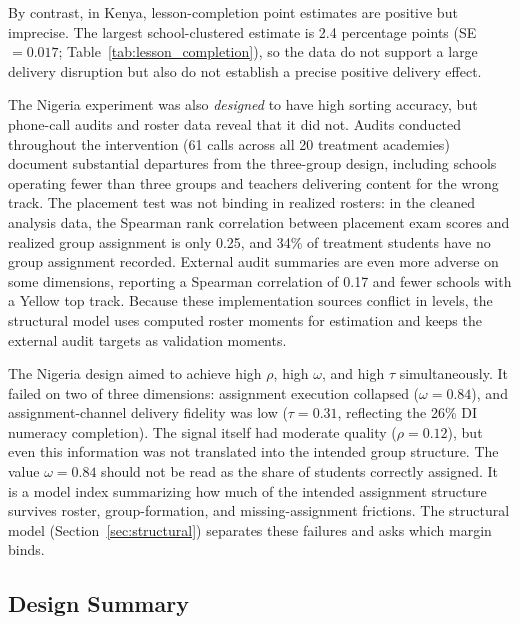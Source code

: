 \documentclass[11pt]{article}
\begin{document}
By contrast, in Kenya, lesson-completion point estimates are positive but imprecise. The largest school-clustered estimate is 2.4 percentage points (SE $=0.017$; Table~\ref{tab:lesson_completion}), so the data do not support a large delivery disruption but also do not establish a precise positive delivery effect.

The Nigeria experiment was also \emph{designed} to have high sorting accuracy, but phone-call audits and roster data reveal that it did not. Audits conducted throughout the intervention (61 calls across all 20 treatment academies) document substantial departures from the three-group design, including schools operating fewer than three groups and teachers delivering content for the wrong track. The placement test was not binding in realized rosters: in the cleaned analysis data, the Spearman rank correlation between placement exam scores and realized group assignment is only 0.25, and 34\% of treatment students have no group assignment recorded. External audit summaries are even more adverse on some dimensions, reporting a Spearman correlation of 0.17 and fewer schools with a Yellow top track. Because these implementation sources conflict in levels, the structural model uses computed roster moments for estimation and keeps the external audit targets as validation moments.

The Nigeria design aimed to achieve high $\rho$, high $\omega$, and high $\tau$ simultaneously. It failed on two of three dimensions: assignment execution collapsed ($\omega = 0.84$), and assignment-channel delivery fidelity was low ($\tau = 0.31$, reflecting the 26\% DI numeracy completion). The signal itself had moderate quality ($\rho = 0.12$), but even this information was not translated into the intended group structure. The value $\omega=0.84$ should not be read as the share of students correctly assigned. It is a model index summarizing how much of the intended assignment structure survives roster, group-formation, and missing-assignment frictions. The structural model (Section~\ref{sec:structural}) separates these failures and asks which margin binds.

\subsection{Design Summary}
\end{document}

